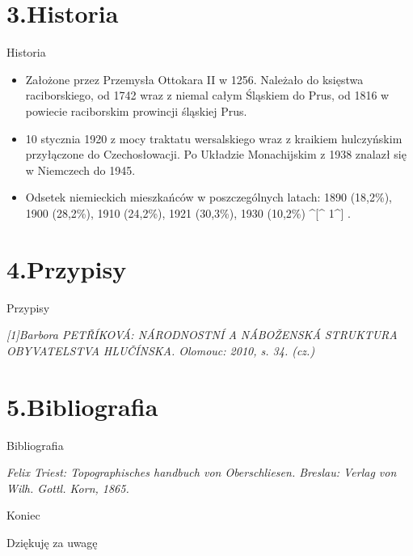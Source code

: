 \documentclass{beamer}
\begin{document}
\section{3.Historia}
\begin{frame}{Historia}
\begin{itemize}
\item{Założone przez Przemysła Ottokara II w 1256. Należało do księstwa raciborskiego, od 1742 wraz z niemal całym Śląskiem do Prus, od 1816 w powiecie raciborskim prowincji śląskiej Prus.}
\pause
\item{10 stycznia 1920 z mocy traktatu wersalskiego wraz z kraikiem hulczyńskim przyłączone do Czechosłowacji. Po Układzie Monachijskim z 1938 znalazł się w Niemczech do 1945.}
\pause
\item{Odsetek niemieckich mieszkańców w poszczególnych latach: 1890 (18,2\%), 1900 (28,2\%), 1910 (24,2\%), 1921 (30,3\%), 1930 (10,2\%) ^[^ 1^] .}
\end{itemize}
\end{frame}

\section{4.Przypisy}
\begin{frame}{Przypisy}
\begin{thebibliography}{99}
\textit{[1]Barbora PETŘÍKOVÁ: NÁRODNOSTNÍ A NÁBOŽENSKÁ STRUKTURA OBYVATELSTVA HLUČÍNSKA. Olomouc: 2010, s. 34. (cz.)}
\end{thebibliography}
\end{frame}

\section{5.Bibliografia}
\begin{frame}{Bibliografia}
\begin{thebibliography}{99}
\textit{Felix Triest: Topographisches handbuch von Oberschliesen. Breslau: Verlag von Wilh. Gottl. Korn, 1865.}
\end{thebibliography}
\end{frame}
\begin{frame}{Koniec}
\begin{itemize}
\LARGE
{Dziękuję za uwagę}
\end{itemize}
\end{frame}
\end{document}
